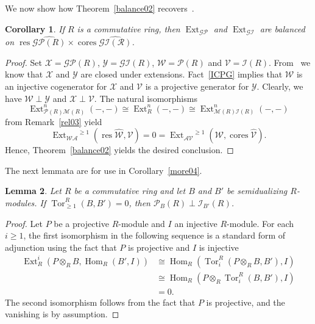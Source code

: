 \documentclass{amsart}
\newtheorem{lem}{Lemma}[section]
\newtheorem{cor}[lem]{Corollary}
\begin{document}
We now show how Theorem~\ref{balance02} recovers~\cite[(3.6)]{holm:gdf}.

\begin{cor} \label{holm1}
If $R$ is a commutative ring, then
${{\operatorname{Ext}}_{{\mathcal{{GP}}}}}$ and ${{\operatorname{Ext}}_{{\mathcal{{GI}}}}}$ are balanced on
${\operatorname{res}{\widehat{{{\mathcal{{GP}}}(R)}}}}\times{{\operatorname{cores}{\widehat{{{\mathcal{{{GI(R)}}}}}}}}}$.
\end{cor}

\begin{proof}
Set
${{\mathcal{{X}}}}={{\mathcal{{GP}}}}(R)$, 
${{\mathcal{{Y}}}}={{\mathcal{{GI}}}}(R)$,
${{\mathcal{{W}}}}={{\mathcal{{P}}}}(R)$ and
${{\mathcal{{V}}}}={{\mathcal{{I}}}}(R)$.
From~\cite[(2.5),(2.6)]{holm:ghd} we know that
${{\mathcal{{X}}}}$ and ${{\mathcal{{Y}}}}$ are  closed under extensions.
Fact~\ref{ICPG} implies that 
${{\mathcal{{W}}}}$ is an injective cogenerator for ${{\mathcal{{X}}}}$ and
${{\mathcal{{V}}}}$ is a projective generator for ${{\mathcal{{Y}}}}$.
Clearly, we have
${{\mathcal{{W}}}}\perp{{\mathcal{{Y}}}}$ and ${{\mathcal{{X}}}}\perp{{\mathcal{{V}}}}$.
The natural isomorphisms
$${\operatorname{Ext}}^n_{{{\mathcal{{P}}}}(R){{\mathcal{{M}}}}(R)}(-,-)\cong
{\operatorname{Ext}}^n_{R}(-,-)\cong
{\operatorname{Ext}}^n_{{{\mathcal{{M}}}}(R){{\mathcal{{I}}}}(R)}(-,-)$$
from Remark~\ref{rel03} yield
$${{\operatorname{Ext}}_{{{\mathcal{{W}}}} {{\mathcal{{A}}}}}}^{{\geqslant}1}({{\operatorname{res}{\widehat{{{\mathcal{{{W}}}}}}}}},{{\mathcal{{V}}}})=0={{\operatorname{Ext}}_{{{\mathcal{{A}}}}{{\mathcal{{V}}}}}}^{{\geqslant}1}({{\mathcal{{W}}}}, {{\operatorname{cores}{\widehat{{{\mathcal{{{V}}}}}}}}}).$$
Hence, Theorem~\ref{balance02} yields the desired conclusion.
\end{proof}

The next lemmata are for use in Corollary~\ref{more04}.

\begin{lem} \label{tak01}
Let $R$ be a commutative ring and let $B$ and $B'$ be semidualizing
$R$-modules.  If ${\operatorname{Tor}}^R_{{\geqslant} 1}(B,B')=0$, then
${{\mathcal{{P}}}_B}(R)\perp{{\mathcal{{I}}}}_{B'}(R)$.
\end{lem}

\begin{proof}
Let $P$ be a projective $R$-module and $I$ an injective $R$-module.
For each $i{\geqslant} 1$, the first isomorphism in the following sequence is 
a standard form of adjunction using the fact that $P$ is projective and $I$ is injective
\begin{align*}
{\operatorname{Ext}}^i_R(P\otimes_R B,{\operatorname{Hom}}_R(B',I))
&\cong{\operatorname{Hom}}_R({\operatorname{Tor}}_i^R(P\otimes_R B,B'),I)\\
&\cong{\operatorname{Hom}}_R(P\otimes_R {\operatorname{Tor}}_i^R(B,B'),I)\\
&=0.
\end{align*}
The second isomorphism follows from the fact that $P$ is projective,
and the
vanishing is by assumption.
\end{proof}
\end{document}
